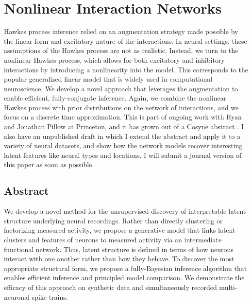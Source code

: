 
\chapter{Nonlinear Interaction Networks}



Hawkes process inference relied on an augmentation strategy 
made possible by the linear form and excitatory nature 
 of the interactions. In neural settings, these assumptions 
of the Hawkes process are not as realistic. Instead, we turn to 
the nonlinear Hawkes process, which allows for both excitatory 
and inhibitory interactions by introducing a nonlinearity 
into the model. This corresponds to the popular generalized 
linear model that is widely used in computational neuroscience. 
We develop a novel approach that leverages the 
\polyagamma augmentation to enable efficient, fully-conjugate 
inference. Again, we combine the nonlinear Hawkes process with 
prior distributions on the network of interactions, and we focus 
on a discrete time approximation. This is part of ongoing work 
with Ryan and Jonathan Pillow at Princeton, and it has grown out 
of a Cosyne abstract \cite{linderman2015cosyne}. I also have an 
unpublished draft in which I extend the abstract and apply it 
to a variety of neural datasets, and show how the network models 
recover interesting latent features like neural types and locations.
I will submit a journal version of this paper as soon as possible.

\section{Abstract} 
We develop a novel method for the unsupervised discovery of interpretable latent structure underlying neural recordings. 
Rather than directly clustering or factorizing measured activity, we propose a generative model that links latent clusters and features of neurons to measured activity via an intermediate functional network. 
Thus, latent structure is defined in terms of how neurons interact with one another rather than how they behave. 
To discover the most appropriate structural form, we propose a fully-Bayesian inference algorithm that enables efficient inference and principled model comparison. 
We demonstrate the efficacy of this approach on synthetic data and simultaneously recorded multi-neuronal spike trains.


